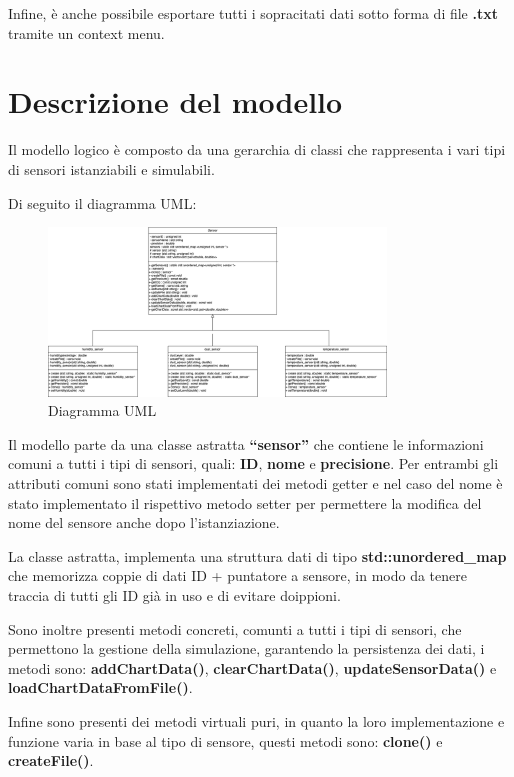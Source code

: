\documentclass{article}
\begin{document}
    Infine, è anche possibile esportare tutti i sopracitati dati sotto forma di file \textbf{.txt} tramite un context menu.

    \section{Descrizione del modello}
    Il modello logico è composto da una gerarchia di classi che rappresenta i vari tipi di sensori istanziabili e simulabili. 
        
    Di seguito il diagramma UML:    
    \begin{figure}[h!]
        \centering
        \includegraphics[width=0.8\textwidth]{UML.png}
        \caption*{Diagramma UML}
    \end{figure}

\newpage
\noindent Il modello parte da una classe astratta \textbf{“sensor”} che contiene le informazioni comuni a tutti i tipi di sensori, quali: \textbf{ID}, \textbf{nome} e \textbf{precisione}.
Per entrambi gli attributi comuni sono stati implementati dei metodi getter e nel caso del nome è stato implementato il rispettivo metodo setter per permettere la modifica del nome del sensore anche dopo l’istanziazione. 

\noindent La classe astratta, implementa una struttura dati di tipo \textbf{std::unordered\_map} che memorizza coppie di dati ID + puntatore a sensore, in modo da tenere traccia di tutti gli ID già in uso e di evitare doippioni.

\noindent Sono inoltre presenti metodi concreti, comunti a tutti i tipi di sensori, che permettono la gestione della simulazione, garantendo la persistenza dei dati, i metodi sono:
\textbf{addChartData()}, \textbf{clearChartData()}, \textbf{updateSensorData()} e \textbf{loadChartDataFromFile()}.

\noindent Infine sono presenti dei metodi virtuali puri, in quanto la loro implementazione e funzione varia in base al tipo di sensore, questi metodi sono: \textbf{clone()} e \textbf{createFile()}.
\end{document}
